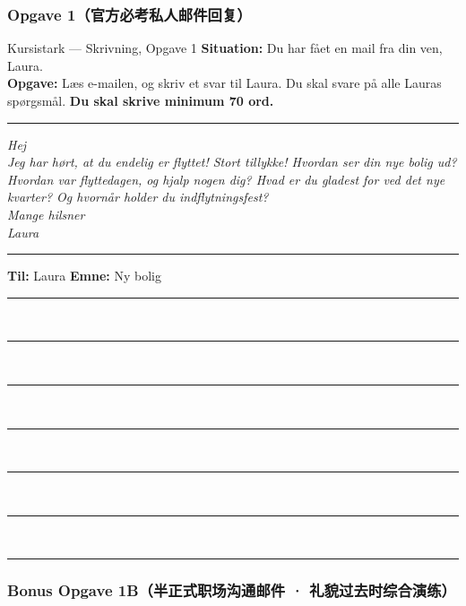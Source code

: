 \clearpage
{}

\subsubsection*{Opgave 1（官方必考私人邮件回复）}

\begin{emailbox}{Kursistark --- Skrivning, Opgave 1}
\textbf{Situation:} Du har fået en mail fra din ven, Laura.\\
\textbf{Opgave:} Læs e-mailen, og skriv et svar til Laura. Du skal svare på alle Lauras spørgsmål. \textbf{Du skal skrive minimum 70 ord.}

\vspace{0.3em}
\hrule
\vspace{0.3em}

\textit{Hej\\
Jeg har hørt, at du endelig er flyttet! Stort tillykke! Hvordan ser din nye bolig ud? Hvordan var flyttedagen, og hjalp nogen dig? Hvad er du gladest for ved det nye kvarter? Og hvornår holder du indflytningsfest?\\
Mange hilsner\\
Laura}

\vspace{0.25em}
\hrule
\vspace{0.25em}
\textbf{Til:} Laura \qquad \textbf{Emne:} Ny bolig\\[2pt]
\rule{\linewidth}{0.4pt}\\[4pt]
\rule{\linewidth}{0.4pt}\\[4pt]
\rule{\linewidth}{0.4pt}\\[4pt]
\rule{\linewidth}{0.4pt}\\[4pt]
\rule{\linewidth}{0.4pt}\\[4pt]
\rule{\linewidth}{0.4pt}\\[4pt]
\rule{\linewidth}{0.4pt}
\end{emailbox}

\subsubsection*{Bonus Opgave 1B（半正式职场沟通邮件 · 礼貌过去时综合演练）}

